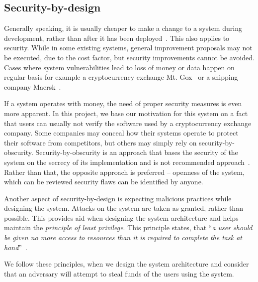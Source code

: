 \subsection{Security-by-design}

Generally speaking, it is usually cheaper to make a change to a system during development, rather than after it has been deployed~\cite[p. 9]{Sommerville2011SoftwareEngineering}. This also applies to security. While in some existing systems, general improvement proposals may not be executed, due to the cost factor, but security improvements cannot be avoided. Cases where system vulnerabilities lead to loss of money or data happen on regular basis for example a cryptocurrency exchange Mt. Gox~\cite{Popper2014ApparentTimes} or a shipping company Maersk~\cite{JordanNovet2017MaerskMillion}.

If a system operates with money, the need of proper security measures is even more apparent. In this project, we base our motivation for this system on a fact that users can usually not verify the software used by a cryptocurrency exchange company. Some companies may conceal how their systems operate to protect their software from competitors, but others may simply rely on security-by-obscurity. Security-by-obscurity is an approach that bases the security of the system on the secrecy of its implementation and is not recommended approach~\cite{Scarfone2008GuideTechnology}. Rather than that, the opposite approach is preferred -- openness of the system, which can be reviewed security flaws can be identified by anyone.

Another aspect of security-by-design is expecting malicious practices while designing the system. Attacks on the system are taken as granted, rather than possible. This provides aid when designing the system architecture and helps maintain the \textit{principle of least privilege}. This principle states, that ``\textit{a user should be given no more access to resources than it is required to complete the task at hand}''~\cite{XiaopuSpecifyingControl}. 

We follow these principles, when we design the system architecture and consider that an adversary will attempt to steal funds of the users using the system.